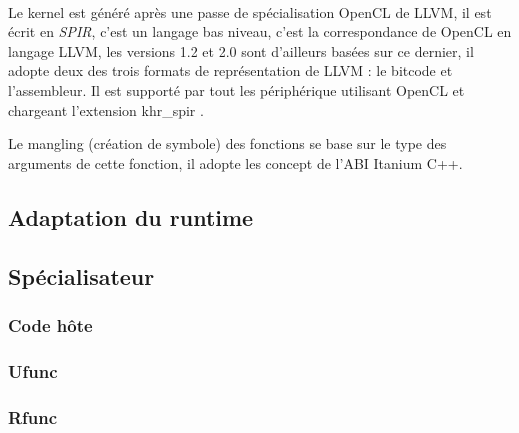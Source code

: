 \paragraph{}
Le kernel est généré après une passe de spécialisation OpenCL de LLVM, il est
écrit en \emph{SPIR}, c'est un langage bas niveau, c'est la correspondance de
OpenCL en langage LLVM, les versions 1.2 et 2.0 sont d'ailleurs basées sur ce
dernier, il adopte deux des trois formats de représentation de LLVM : le bitcode
et l'assembleur. Il est supporté par tout les périphérique utilisant OpenCL et
chargeant l'extension \og{} khr\_spir \fg{}.

Le mangling (création de symbole) des fonctions se base sur le type des
arguments de cette fonction, il adopte les concept de l'ABI Itanium C++.

\subsection{Adaptation du runtime}
\paragraph{}

\subsection{Spécialisateur}
\paragraph{}

\subsubsection{Code hôte}
\paragraph{}

\subsubsection{Ufunc}
\paragraph{}

\subsubsection{Rfunc}
